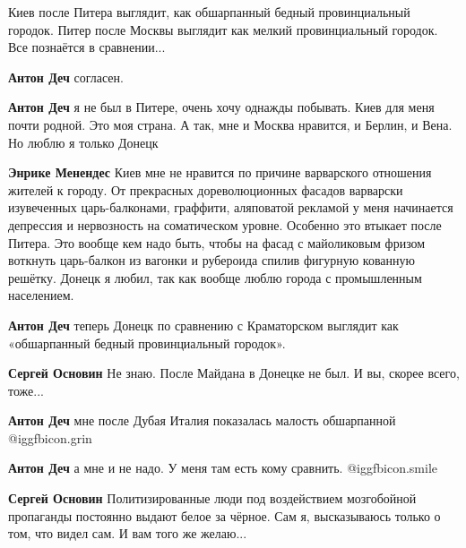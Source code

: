  
 
 
 
 
\zzSecCmt

\begin{itemize} %
Киев после Питера выглядит, как обшарпанный бедный провинциальный городок.
Питер после Москвы выглядит как мелкий провинциальный городок.
Все познаётся в сравнении...

\begin{itemize} %
\textbf{Антон Деч} согласен.

\textbf{Антон Деч} я не был в Питере, очень хочу однажды побывать. Киев для меня почти родной. Это моя страна. А так, мне и Москва нравится, и Берлин, и Вена.
Но люблю я только Донецк

\textbf{Энрике Менендес} Киев мне не нравится по причине варварского отношения жителей к городу.
От прекрасных дореволюционных фасадов варварски изувеченных царь-балконами, граффити, аляповатой рекламой у меня начинается депрессия и нервозность на соматическом уровне. Особенно это втыкает после Питера. Это вообще кем надо быть, чтобы на фасад с майоликовым фризом воткнуть царь-балкон из вагонки и рубероида спилив фигурную кованную решётку.
Донецк я любил, так как вообще люблю города с промышленным населением.

\textbf{Антон Деч} теперь Донецк по сравнению с Краматорском выглядит как «обшарпанный бедный провинциальный городок».

\textbf{Сергей Основин} Не знаю. После Майдана в Донецке не был. И вы, скорее всего, тоже...

\textbf{Антон Деч} мне после Дубая Италия показалась малость обшарпанной @igg{fbicon.grin} 

\textbf{Антон Деч} а мне и не надо. У меня там есть кому сравнить.  @igg{fbicon.smile} 

\textbf{Сергей Основин} Политизированные люди под воздействием мозгобойной пропаганды постоянно выдают белое за чёрное.
Сам я, высказываюсь только о том, что видел сам. И вам того же желаю...


\end{itemize}
\end{itemize}
